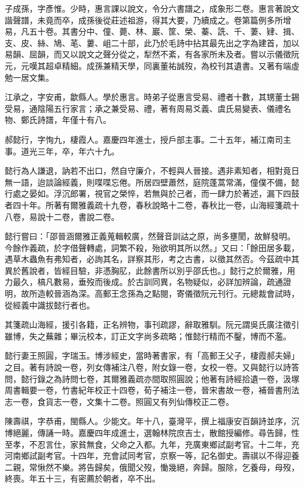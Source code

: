 \begin{pinyinscope}
子成孫，字彥惟。少時，惠言課以說文，令分六書譜之，成象形二卷。惠言著說文諧聲譜，未竟而卒，成孫後從莊述祖游，得其大要，乃續成之。卷第篇例多所增易，凡五十卷。其書分中、僮、薨、林、巖、筐、榮、蓁、詵、千、萋、肄、揖、支、皮、絲、鳩、芼、蔞、岨二十部，此乃於毛詩中拈其最先出之字為建首，加以易韻、屈韻，而又以說文之聲分從之，犁然不紊，有各家所未及者。嘗以示儀徵阮元，元嘆其超卓精細。成孫兼精天學，同裏董祐誠歿，為校刊其遺書。又著有端虛勉一居文集。

江承之，字安甫，歙縣人。學於惠言。時弟子從惠言受易、禮者十數，其甥董士錫受易，通陰陽五行家言；承之兼受易、禮，著有周易爻義、虞氏易變表、儀禮名物、鄭氏詩譜，年僅十有八。

郝懿行，字恂九，棲霞人。嘉慶四年進士，授戶部主事。二十五年，補江南司主事。道光三年，卒，年六十九。

懿行為人謙退，訥若不出口，然自守廉介，不輕與人晉接。遇非素知者，相對竟日無一語，迨談論經義，則喋喋忘倦。所居四壁蕭然，庭院蓬蒿常滿，僮僕不備，懿行處之晏如。浮沉郎署，視官之榮悴，若無與於己者，而一肆力於著述，漏下四鼓者四十年。所著有爾雅義疏十九卷，春秋說略十二卷，春秋比一卷，山海經箋疏十八卷，易說十二卷，書說二卷。

懿行嘗曰：「邵晉涵爾雅正義蒐輯較廣，然聲音訓詁之原，尚多壅閡，故鮮發明。今餘作義疏，於字借聲轉處，詞繁不殺，殆欲明其所以然。」又曰：「餘田居多載，遇草木蟲魚有弗知者，必詢其名，詳察其形，考之古書，以徵其然否。今茲疏中其異於舊說者，皆經目驗，非憑胸肊，此餘書所以別乎邵氏也。」懿行之於爾雅，用力最久，槁凡數易，垂歿而後成。於古訓同異，名物疑似，必詳加辨論，疏通證明，故所造較晉涵為深。高郵王念孫為之點閱，寄儀徵阮元刊行。元總裁會試時，從經義中識拔懿行者也。

其箋疏山海經，援引各籍，正名辨物，事刊疏謬，辭取雅馴。阮元謂吳氏廣注徵引雖博，失之蕪雜；畢沅校本，訂正文字尚多疏略；惟懿行精而不鑿，博而不濫。

懿行妻王照圓，字瑞玉。博涉經史，當時著書家，有「高郵王父子，棲霞郝夫婦」之目。著有詩說一卷，列女傳補注八卷，附女錄一卷，女校一卷。又與懿行以詩答問，懿行錄之為詩問七卷，其爾雅義疏亦間取照圓說；他著有詩經拾遺一卷，汲塚周書輯要一卷，竹書紀年校正十四卷，荀子補注一卷，晉宋書故一卷，補晉書刑法志一卷，食貨志一卷，文集十二卷。照圓又有列仙傳校正二卷。

陳壽祺，字恭甫，閩縣人。少能文。年十八，臺灣平，撰上福康安百韻詩並序，沉博絕麗，傳誦一時。嘉慶四年成進士，選翰林院庶吉士，散館授編修。尋告歸，性至孝，不忍言仕，家貧無食，父命之入都。九年，充廣東鄉試副考官。十二年，充河南鄉試副考官。十四年，充會試同考官，京察一等，記名御史。壽祺以不得迎養二親，常愀然不樂。將告歸矣，俄聞父歿，慟幾絕，奔歸。服除，乞養母，母歿，終喪。年五十三，有密薦於朝者，卒不出。


\end{pinyinscope}
